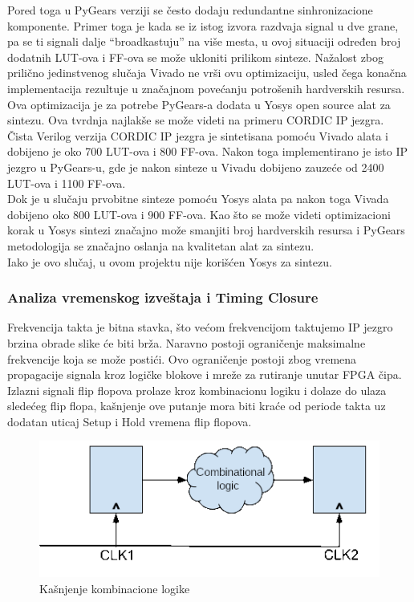 Pored toga u PyGears verziji se često dodaju redundantne sinhronizacione
komponente.
Primer toga je kada se iz istog izvora razdvaja signal u dve grane, pa se ti
signali dalje ``broadkastuju'' na više mesta, u ovoj situaciji određen broj dodatnih LUT-ova i
FF-ova se može ukloniti prilikom sinteze.
Nažalost zbog prilično jedinstvenog slučaja Vivado ne vrši ovu
optimizaciju, usled čega konačna implementacija rezultuje u značajnom povećanju
potrošenih hardverskih resursa.\\

Ova optimizacija je za potrebe PyGears-a dodata u Yosys open source alat za
sintezu.
Ova tvrdnja najlakše se može videti na primeru CORDIC IP jezgra.
Čista Verilog verzija CORDIC IP jezgra je sintetisana pomoću Vivado alata i
dobijeno je oko 700 LUT-ova i 800 FF-ova.
Nakon toga implementirano je isto IP jezgro u PyGears-u, gde je nakon sinteze u
Vivadu dobijeno zauzeće od 2400 LUT-ova i 1100 FF-ova. \\
Dok je u slučaju prvobitne sinteze pomoću Yosys alata pa nakon toga Vivada
dobijeno oko 800 LUT-ova i 900 FF-ova.
Kao što se može videti optimizacioni korak u Yosys sintezi značajno može
smanjiti broj hardverskih resursa i PyGears metodologija se značajno oslanja na
kvalitetan alat za sintezu. \\
Iako je ovo slučaj, u ovom projektu nije korišćen Yosys za sintezu.


\subsubsection{Analiza vremenskog izveštaja i Timing Closure}

Frekvencija takta je bitna stavka, što većom frekvencijom taktujemo IP jezgro
brzina obrade slike će biti brža.
Naravno postoji ograničenje maksimalne frekvencije koja se može postići.
Ovo ograničenje postoji zbog vremena propagacije signala kroz logičke blokove i mreže za rutiranje unutar FPGA čipa.
Izlazni signali flip flopova prolaze kroz kombinacionu logiku i dolaze do ulaza
sledećeg flip flopa, kašnjenje ove putanje mora biti kraće od periode takta uz
dodatan uticaj Setup i Hold vremena flip flopova.

\begin{figure}[H]
  \centering
  \includegraphics[width=0.55\linewidth]{images/comb.png}
  \caption{Kašnjenje kombinacione logike}
  \label{comb_logic}
\end{figure}

